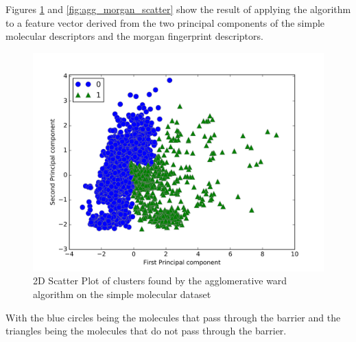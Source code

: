 \documentclass[a4paper,12pt]{report}
\begin{document}
			Figures \ref{fig:agg_smd_scatter} and \ref{fig:agg_morgan_scatter} show the result of applying the algorithm to a feature vector derived from the two principal components of the simple molecular descriptors and the morgan fingerprint descriptors. 
			\begin{figure}[H]
				\centering
				\includegraphics[width=\textwidth,scale=1,totalheight=0.4\textheight]{images/agg_smd_scatter}
				\caption{2D Scatter Plot of clusters found by the agglomerative ward algorithm on the simple molecular dataset}
				\label{fig:agg_smd_scatter}
			\end{figure}
			With the blue circles being the molecules that pass through the barrier and the triangles being the molecules that do not pass through the barrier.
\end{document}
